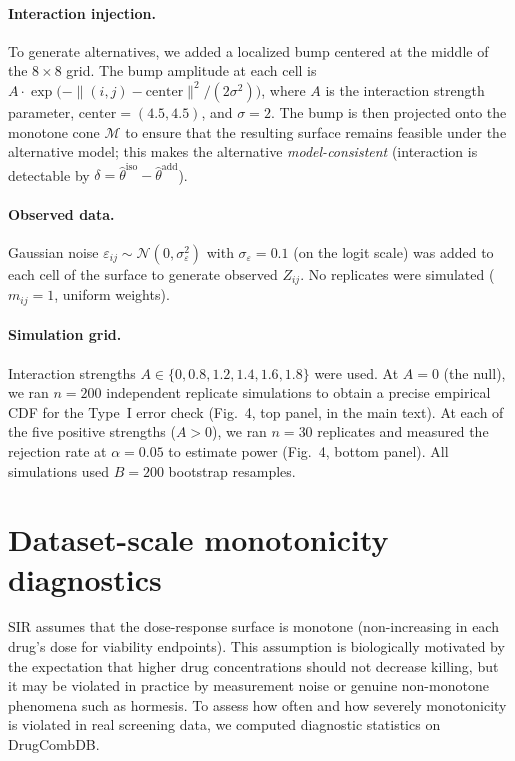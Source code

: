 \documentclass[11pt]{article}
\begin{document}
\paragraph{Interaction injection.}
To generate alternatives, we added a localized bump centered at the middle of the $8\times 8$ grid.
The bump amplitude at each cell is $A \cdot \exp\!\bigl(-\|(i,j)-\mathrm{center}\|^2 / (2\sigma^2)\bigr)$, where $A$ is the interaction strength parameter, $\mathrm{center}=(4.5, 4.5)$, and $\sigma = 2$.
The bump is then projected onto the monotone cone $\mathcal{M}$ to ensure that the resulting surface remains feasible under the alternative model; this makes the alternative \emph{model-consistent} (interaction is detectable by $\delta = \hat\theta^{\mathrm{iso}} - \hat\theta^{\mathrm{add}}$).

\paragraph{Observed data.}
Gaussian noise $\varepsilon_{ij} \sim \mathcal{N}(0, \sigma^2_\varepsilon)$ with $\sigma_\varepsilon = 0.1$ (on the logit scale) was added to each cell of the surface to generate observed $Z_{ij}$.
No replicates were simulated ($m_{ij}=1$, uniform weights).

\paragraph{Simulation grid.}
Interaction strengths $A \in \{0, 0.8, 1.2, 1.4, 1.6, 1.8\}$ were used.
At $A=0$ (the null), we ran $n=200$ independent replicate simulations to obtain a precise empirical CDF for the Type~I error check (Fig.~4, top panel, in the main text).
At each of the five positive strengths ($A > 0$), we ran $n=30$ replicates and measured the rejection rate at $\alpha=0.05$ to estimate power (Fig.~4, bottom panel).
All simulations used $B=200$ bootstrap resamples.

\section{Dataset-scale monotonicity diagnostics}

SIR assumes that the dose-response surface is monotone (non-increasing in each drug's dose for viability endpoints).
This assumption is biologically motivated by the expectation that higher drug concentrations should not decrease killing, but it may be violated in practice by measurement noise or genuine non-monotone phenomena such as hormesis.
To assess how often and how severely monotonicity is violated in real screening data, we computed diagnostic statistics on DrugCombDB.
\end{document}
